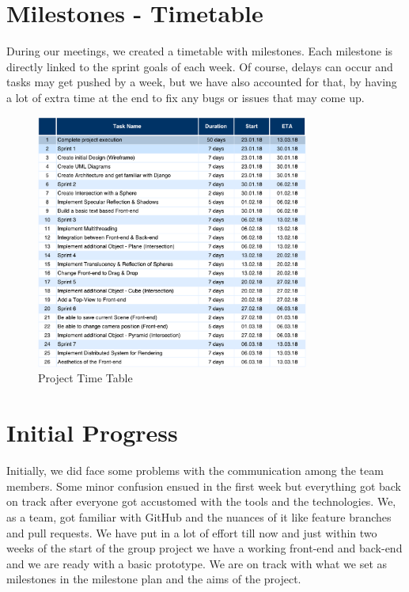 \documentclass[10pt]{scrartcl}
\begin{document}
\section{Milestones - Timetable}
During our meetings, we created a timetable with milestones. Each milestone is directly linked to the sprint goals of each week. Of course, delays can occur and tasks may get pushed by a week, but we have also accounted for that, by having a lot of extra time at the end to fix any bugs or issues that may come up.
\begin{figure}[h]
\centering
\includegraphics[width=0.8\textwidth]{images/time_table.pdf} %
\caption{Project Time Table} 
\label{fig:TimeTable} 
\end{figure}

\section{Initial Progress}
Initially, we did face some problems with the communication among the team members. Some minor confusion ensued in the first week but everything got back on track after everyone got accustomed with the tools and the technologies. We, as a team, got familiar with GitHub and the nuances of it like feature branches and pull requests. We have put in a lot of effort till now and just within two weeks of the start of the group project we have a working front-end and back-end and we are ready with a basic prototype. We are on track with what we set as milestones in the milestone plan and the aims of the project.
\end{document}

